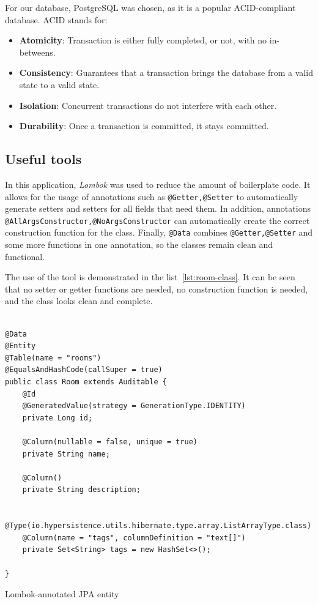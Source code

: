 For our database, PostgreSQL was chosen, as it is a popular ACID-compliant database.
ACID stands for:
\begin{itemize}
    \item \textbf{Atomicity}: Transaction is either fully completed, or not, with no in-betweens.
    \item \textbf{Consistency}: Guarantees that a transaction brings the database from a valid state to a valid state.
    \item \textbf{Isolation}: Concurrent transactions do not interfere with each other.
    \item \textbf{Durability}: Once a transaction is committed, it stays committed.
\end{itemize}


\subsection{Useful tools}\label{subsec:useful-tools}
In this application, \textit{Lombok} was used to reduce the amount of boilerplate code.
It allows for the usage of annotations such as \texttt{@Getter,@Setter} to automatically generate setters and setters for all fields that need them.
In addition, annotations \texttt{@AllArgsConstructor,@NoArgsConstructor} can automatically create the correct construction function for the class.
Finally, \texttt{@Data} combines \texttt{@Getter,@Setter} and some more functions in one annotation, so the classes remain clean and functional.

The use of the tool is demonstrated in the list~\ref{lst:room-class}.
It can be seen that no setter or getter functions are needed, no construction function is needed, and the class looks clean and complete.


\begin{listing}[H]
    \begin{verbatim}

@Data
@Entity
@Table(name = "rooms")
@EqualsAndHashCode(callSuper = true)
public class Room extends Auditable {
    @Id
    @GeneratedValue(strategy = GenerationType.IDENTITY)
    private Long id;

    @Column(nullable = false, unique = true)
    private String name;

    @Column()
    private String description;

    @Type(io.hypersistence.utils.hibernate.type.array.ListArrayType.class)
    @Column(name = "tags", columnDefinition = "text[]")
    private Set<String> tags = new HashSet<>();

}
    \end{verbatim}
    \caption{Lombok-annotated JPA entity}
    \label{lst:room-class}
\end{listing}

